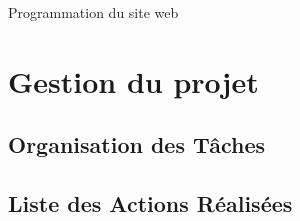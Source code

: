 \documentclass[a4paper,12pt]{report}  %
\begin{document}
Programmation du site web




\section{Gestion du projet}

\subsection{Organisation des Tâches}


\subsection{Liste des Actions Réalisées}
\end{document}
